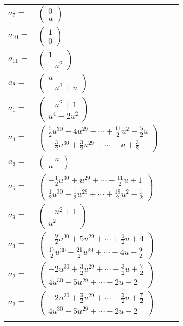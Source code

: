 \documentclass[1p]{elsarticle_modified}
\theoremstyle{definition}
\begin{document}
\begin{tabular}{m{7pt} m{180pt} m{7pt} m{180pt} }
\flushright $a_{7}=$&$\begin{pmatrix}0\\u\end{pmatrix}$ \\
\flushright $a_{10}=$&$\begin{pmatrix}1\\0\end{pmatrix}$ \\
\flushright $a_{11}=$&$\begin{pmatrix}1\\- u^2\end{pmatrix}$ \\
\flushright $a_{8}=$&$\begin{pmatrix}u\\- u^3+u\end{pmatrix}$ \\
\flushright $a_{1}=$&$\begin{pmatrix}- u^2+1\\u^4-2 u^2\end{pmatrix}$ \\
\flushright $a_{4}=$&$\begin{pmatrix}\frac{5}{2} u^{30}-4 u^{29}+\cdots+\frac{11}{2} u^2-\frac{5}{2} u\\-\frac{3}{2} u^{30}+\frac{3}{2} u^{29}+\cdots- u+\frac{3}{2}\end{pmatrix}$ \\
\flushright $a_{6}=$&$\begin{pmatrix}- u\\u\end{pmatrix}$ \\
\flushright $a_{5}=$&$\begin{pmatrix}-\frac{1}{2} u^{30}+u^{29}+\cdots-\frac{11}{2} u+1\\\frac{1}{2} u^{30}-\frac{1}{2} u^{29}+\cdots+\frac{19}{2} u^2-\frac{1}{2}\end{pmatrix}$ \\
\flushright $a_{9}=$&$\begin{pmatrix}- u^2+1\\u^2\end{pmatrix}$ \\
\flushright $a_{3}=$&$\begin{pmatrix}-\frac{9}{2} u^{30}+5 u^{29}+\cdots+\frac{1}{2} u+4\\\frac{17}{2} u^{30}-\frac{21}{2} u^{29}+\cdots-4 u-\frac{9}{2}\end{pmatrix}$ \\
\flushright $a_{2}=$&$\begin{pmatrix}-2 u^{30}+\frac{3}{2} u^{29}+\cdots-\frac{3}{2} u+\frac{7}{2}\\4 u^{30}-5 u^{29}+\cdots-2 u-2\end{pmatrix}$\\ \flushright $a_{2}=$&$\begin{pmatrix}-2 u^{30}+\frac{3}{2} u^{29}+\cdots-\frac{3}{2} u+\frac{7}{2}\\4 u^{30}-5 u^{29}+\cdots-2 u-2\end{pmatrix}$\\&\end{tabular}
\end{document}
